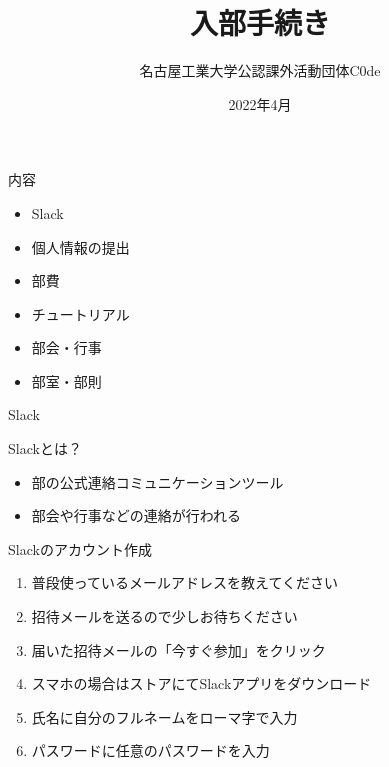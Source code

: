 \documentclass[12pt, unicode]{beamer}
\title{入部手続き}
\author{名古屋工業大学公認課外活動団体C0de}
\date{2022年4月} %
\begin{document}
\begin{frame}
    \maketitle
\end{frame}

\begin{frame}{内容}
    \begin{itemize}
        \item Slack
        \item 個人情報の提出
        \item 部費
        \item チュートリアル
        \item 部会・行事
        \item 部室・部則
    \end{itemize}
\end{frame}

\begin{frame}{Slack}
    \begin{block}{Slackとは？}
        \begin{itemize}
            \item 部の公式連絡コミュニケーションツール
            \item 部会や行事などの連絡が行われる
        \end{itemize}
    \end{block}

    \begin{block}{Slackのアカウント作成}
        \begin{enumerate}
            \item 普段使っているメールアドレスを教えてください
            \item 招待メールを送るので少しお待ちください
            \item 届いた招待メールの「今すぐ参加」をクリック
            \item スマホの場合はストアにてSlackアプリをダウンロード
            \item 氏名に自分のフルネームをローマ字で入力
            \item パスワードに任意のパスワードを入力
        \end{enumerate}
    \end{block}
\end{frame}
\end{document}
